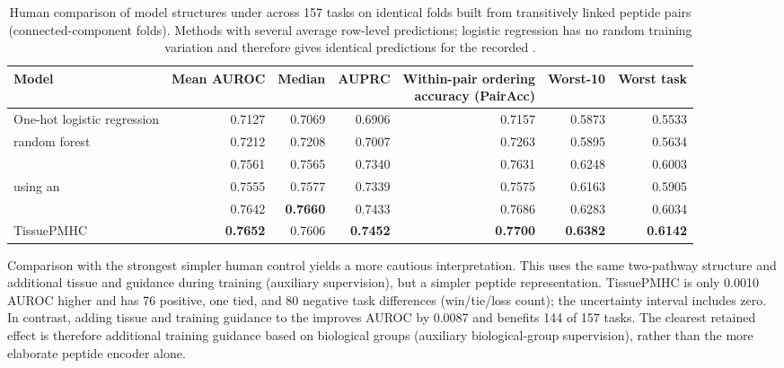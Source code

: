 \begin{table}[tbp]
\centering
\caption{Human comparison of model structures under \plainPeptideOOF{} across 157 tasks on identical folds built from transitively linked peptide pairs (connected-component folds). Methods with several \plainSeeds{} average row-level predictions; logistic regression has no random training variation and therefore gives identical predictions for the recorded \plainSeeds{}.}
\label{tab:human-strict-architectures}
\scriptsize
\setlength{\tabcolsep}{2pt}
\begin{tabularx}{\textwidth}{>{\raggedright\arraybackslash}Xrrrrrr}
\toprule
Model & Mean AUROC & Median & AUPRC & \shortstack{Within-pair ordering\\accuracy (PairAcc)} & Worst-10 & Worst task \\
\midrule
One-hot logistic regression & 0.7127 & 0.7069 & 0.6906 & 0.7157 & 0.5873 & 0.5533 \\
\plainBLOSUM{} random forest & 0.7212 & 0.7208 & 0.7007 & 0.7263 & 0.5895 & 0.5634 \\
\plainSharedHeads{} & 0.7561 & 0.7565 & 0.7340 & 0.7631 & 0.6248 & 0.6003 \\
\plainPlainDual{} using an \plainMLP{} & 0.7555 & 0.7577 & 0.7339 & 0.7575 & 0.6163 & 0.5905 \\
\plainAuxDual{} & 0.7642 & \textbf{0.7660} & 0.7433 & 0.7686 & 0.6283 & 0.6034 \\
TissuePMHC & \textbf{0.7652} & 0.7606 & \textbf{0.7452} & \textbf{0.7700} & \textbf{0.6382} & \textbf{0.6142} \\
\bottomrule
\end{tabularx}
\end{table}

Comparison with the strongest simpler human control yields a more cautious interpretation. This \plainAuxDual{} uses the same two-pathway structure and additional tissue and \plainHLA{} guidance during training (auxiliary supervision), but a simpler peptide representation. TissuePMHC is only 0.0010 AUROC higher and has 76 positive, one tied, and 80 negative task differences (win/tie/loss count); the uncertainty interval includes zero. In contrast, adding tissue and \plainHLA{} training guidance to the \plainPlainDual{} improves AUROC by 0.0087 and benefits 144 of 157 tasks. The clearest retained effect is therefore additional training guidance based on biological groups (auxiliary biological-group supervision), rather than the more elaborate peptide encoder alone.

